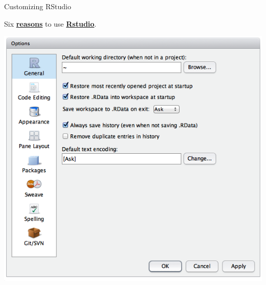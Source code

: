 \documentclass[ignorenonframetext,]{beamer}
\begin{document}
\begin{frame}{Customizing RStudio}

\begin{block}{Six
\href{http://www.r-bloggers.com/top-6-reasons-you-need-to-be-using-rstudio/}{\textbf{reasons}}
to use
\href{https://support.rstudio.com/hc/en-us/articles/200549016-Customizing-RStudio}{\textbf{Rstudio}}.}

\includegraphics{figure/options_general.png}

\end{block}

\end{frame}
\end{document}
